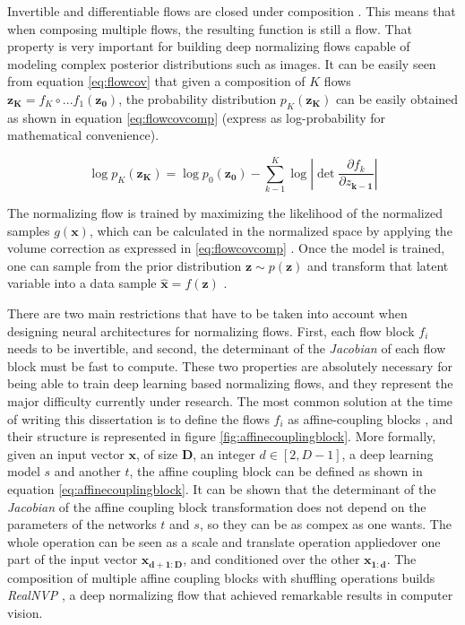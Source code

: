 Invertible and differentiable flows are closed under composition \cite{kobyzev}. This means that when composing multiple flows, the resulting function is still a flow. That property is very important for building deep normalizing flows capable of modeling complex posterior distributions such as images. It can be easily seen from equation \ref{eq:flowcov}  \cite{rezende2015} that given a composition of $K$ flows $\mathbf{z_K}=f_K \circ ... f_1(\mathbf{z_0})$, the probability distribution $p_K(\mathbf{z_K})$ can be easily obtained as shown in equation \ref{eq:flowcovcomp} (express as log-probability for mathematical convenience).

\begin{equation}
\label{eq:flowcovcomp}
\log p_K(\mathbf{z_K}) = \log p_0(\mathbf{z_0}) - \sum_{k-1}^{K} \log  \left| \det \frac{\partial f_k}{\partial z_{\mathbf{k-1}}} \right|
\end{equation}


The normalizing flow is trained by maximizing the likelihood of the normalized samples $g(\mathbf{x})$, which can be calculated in the normalized space by applying the volume correction as expressed in \ref{eq:flowcovcomp} \cite{papamakarios2017}. Once the model is trained, one can sample from the prior distribution $\mathbf{z} \sim p(\mathbf{z})$ and transform that latent variable into a data sample $\hat{\mathbf{x}} = f(\mathbf{z})$ \cite{rezende2015}.

There are two main restrictions that have to be taken into account when designing neural architectures for normalizing flows. First, each flow block $f_i$ needs to be invertible, and second, the determinant of the \textit{Jacobian} of each flow block must be fast to compute. These two properties are absolutely necessary for being able to train deep learning based normalizing flows, and they represent the major difficulty currently under research. The most common solution at the time of writing this dissertation is to define the flows $f_i$ as affine-coupling blocks \cite{dinh2018}, and their structure is represented in figure \ref{fig:affinecouplingblock}. More formally, given an input vector $\mathbf{x}$, of size $\mathbf{D}$, an integer $d \in [2,D-1]$, a deep learning model $s$ and another $t$, the affine coupling block can be defined as shown in equation \ref{eq:affinecouplingblock}. It can be shown that the determinant of the \textit{Jacobian} of the affine coupling block transformation does not depend on the parameters of the networks $t$ and $s$, so they can be as compex as one wants. The whole operation can be seen as a scale and translate operation appliedover one part of the input vector $\mathbf{x_{d+1:D}}$, and conditioned over the other $\mathbf{x_{1:d}}$. The composition of multiple affine coupling blocks with shuffling operations builds \textit{RealNVP} \cite{dinh2018}, a deep normalizing flow that achieved remarkable results in computer vision.

